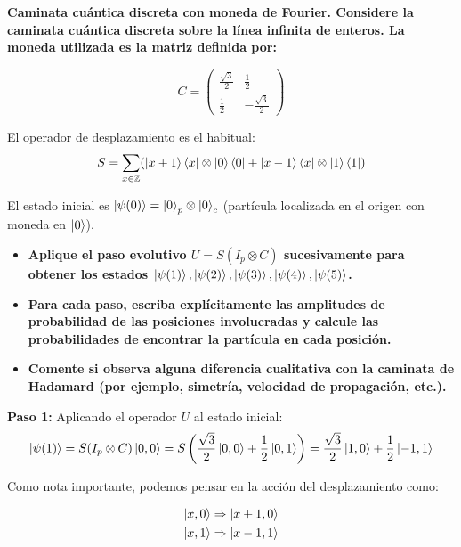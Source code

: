 {\bfseries Caminata cuántica discreta con moneda de Fourier.
Considere la caminata cuántica discreta sobre la línea infinita de enteros. 
La moneda utilizada es la matriz definida por: 


\begin{equation*}
C = 
\begin{pmatrix} \frac{\sqrt{3}}{2} & \frac{1}{2} \\ \frac{1}{2} & -\frac{\sqrt{3}}{2} \end{pmatrix} 
\end{equation*}

El operador de desplazamiento es el habitual:
\begin{equation*}
S = \sum_{x \in \mathbb{Z}} (\ket{x+1}\bra{x} \otimes \ket{0}\bra{0} + \ket{x-1}\bra{x} \otimes \ket{1}\bra{1}) 
\end{equation*}

El estado inicial es $\ket{\psi(0)} = \ket{0}_p \otimes \ket{0}_c$ (partícula localizada en el
origen con moneda en $\ket{0}$). }

\begin{itemize}
    \item {\bfseries Aplique el paso evolutivo $U = S(I_p \otimes C)$ sucesivamente para obtener los
        estados $\ket{\psi(1)}, \ket{\psi(2)}, \ket{\psi(3)}, \ket{\psi(4)}, \ket{\psi(5)}$. }

    \item  {\bfseries Para cada paso, escriba explícitamente las amplitudes de probabilidad de las
            posiciones involucradas y calcule las probabilidades de encontrar la partícula en cada
        posición.}
    \item {\bfseries Comente si observa alguna diferencia cualitativa con la caminata de Hadamard
        (por ejemplo, simetría, velocidad de propagación, etc.).}
\end{itemize}

\vspace{.3cm}

\textbf{Paso 1:}
Aplicando el operador $U$ al estado inicial:
\begin{equation*}
\ket{\psi(1)} = S(I_p \otimes C) \ket{0,0} = S \left( \frac{\sqrt{3}}{2}\ket{0,0} + \frac{1}{2}\ket{0,1} \right) = \frac{\sqrt{3}}{2}\ket{1,0} + \frac{1}{2}\ket{-1,1}
\end{equation*}

Como nota importante, podemos pensar en la acción del desplazamiento como: 

\begin{align*}
    \ket{x,0} &\Rightarrow \ket{x+1,0} \\ 
    \ket{x,1} &\Rightarrow \ket{x-1,1} \\ 
\end{align*}

